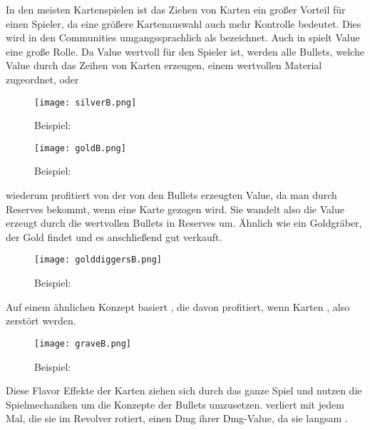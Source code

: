 In den meisten Kartenspielen ist das Ziehen von Karten ein großer Vorteil für einen Spieler, da eine größere Kartenauswahl
auch mehr Kontrolle bedeutet. Dies wird in den Communities umgangssprachlich als  bezeichnet. 
Auch in \FF spielt Value eine große Rolle.
Da Value wertvoll für den Spieler ist, werden alle Bullets, welche Value durch das Zeihen von Karten erzeugen, einem
wertvollen Material zugeordnet, \zB {} oder 

\begin{figure}[H]

    \centering
    \texttt{[image: silverB.png]}
    \caption{Beispiel: }
\end{figure}

    \begin{figure}[H]
        \centering
    \texttt{[image: goldB.png]}
    \caption{Beispiel: }
\end{figure}



 wiederum profitiert von der von den  Bullets erzeugten Value, da man durch  Reserves bekommt,
wenn eine Karte gezogen wird. Sie wandelt also die Value erzeugt durch die wertvollen Bullets in Reserves um.
Ähnlich wie ein Goldgräber, der Gold findet und es anschließend gut verkauft.

\begin{figure}[H]
    \centering
    \texttt{[image: golddiggersB.png]}
    \caption{Beispiel: }
\end{figure}

Auf einem ähnlichen Konzept basiert , die davon profitiert, wenn Karten , also zerstört werden.


\begin{figure}[H]
    \centering
    \texttt{[image: graveB.png]}
    \caption{Beispiel: }
\end{figure}


Diese Flavor Effekte der Karten ziehen sich durch das ganze Spiel und nutzen die Spielmechaniken um die Konzepte der Bullets umzusetzen.
 \zB verliert mit jedem Mal, die sie im Revolver rotiert, einen Dmg ihrer Dmg-Value, da sie langsam .


